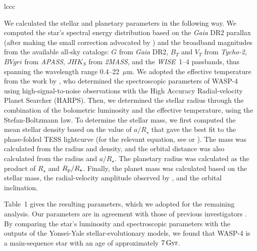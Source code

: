 \documentclass[12pt,twocolumn,tighten]{aastex62}
\begin{document}
\begin{deluxetable}{lccc}

\end{deluxetable}

We calculated the stellar and planetary parameters in the following
way.  We computed the star's spectral energy distribution based on the
{\it Gaia} DR2 parallax (after making the small correction advocated
by \citealt{stassun_evidence_2018}) and the broadband magnitudes from
the available all-sky catalogs: $G$ from {\it Gaia\/} DR2, $B_T$
and $V_T$ from {\it Tycho-2}, $BVgri$ from {\it APASS}, $JHK_S$ from
{\it 2MASS}, and the {\it WISE}~1--4 passbands, thus spanning the
wavelength range 0.4--22~$\mu$m.  We adopted the effective temperature
from the work by \citet{doyle_accurate_2013}, who determined the
spectroscopic parameters of WASP-4 using high-signal-to-noise
observations with the High Accuracy Radial-velocity Planet Searcher
(HARPS).  Then, we determined the stellar radius through the
combination of the bolometric luminosity and the effective
temperature, using the Stefan-Boltzmann law.  To determine the stellar
mass, we first computed the mean stellar density based on the value of
$a/R_\star$ that gave the best fit to the phase-folded TESS lightcurve
(for the relevant equation, see \citealt{seager_unique_2003} or
\citealt{winn_exoplanet_2010}).  The mass was calculated from the
radius and density, and the orbital distance was also calculated from
the radius and $a/R_\star$.  The planetary radius was calculated as
the product of $R_\star$ and $R_{\rm p}/R_\star$.  Finally, the planet
mass was calculated based on the stellar mass, the radial-velocity
amplitude observed by \citet{triaud_spin-orbit_2010}, and the orbital
inclination.

Table~1 gives the resulting parameters, which we adopted for the
remaining analysis.  Our parameters are in agreement with those of
previous investigators
\citep{wilson_wasp-4b_2008,gillon_discovery_2009,winn_transit_2009,southworth_homogeneous_2011,petrucci_no_2013}.
By comparing the star's luminosity and spectroscopic parameters with
the outputs of the Yonsei-Yale stellar-evolutionary models, we found
that WASP-4 is a main-sequence star with an age of approximately
$7\,{\rm Gyr}$.
\end{document}
